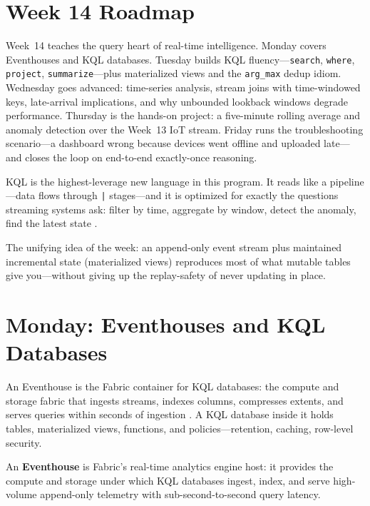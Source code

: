 \section{Week 14 Roadmap}
Week~14 teaches the query heart of real-time intelligence. Monday covers Eventhouses and KQL databases. Tuesday builds KQL fluency---\texttt{search}, \texttt{where}, \texttt{project}, \texttt{summarize}---plus materialized views and the \texttt{arg\_max} dedup idiom. Wednesday goes advanced: time-series analysis, stream joins with time-windowed keys, late-arrival implications, and why unbounded lookback windows degrade performance. Thursday is the hands-on project: a five-minute rolling average and anomaly detection over the Week~13 IoT stream. Friday runs the troubleshooting scenario---a dashboard wrong because devices went offline and uploaded late---and closes the loop on end-to-end exactly-once reasoning.

KQL is the highest-leverage new language in this program. It reads like a pipeline---data flows through \texttt{|} stages---and it is optimized for exactly the questions streaming systems ask: filter by time, aggregate by window, detect the anomaly, find the latest state \cite{microsoftKQL,microsoftFabricEventhouse}.

\begin{notebox}
The unifying idea of the week: an append-only event stream plus maintained incremental state (materialized views) reproduces most of what mutable tables give you---without giving up the replay-safety of never updating in place.
\end{notebox}

\section{Monday: Eventhouses and KQL Databases}
An Eventhouse is the Fabric container for KQL databases: the compute and storage fabric that ingests streams, indexes columns, compresses extents, and serves queries within seconds of ingestion \cite{microsoftFabricEventhouse}. A KQL database inside it holds tables, materialized views, functions, and policies---retention, caching, row-level security.

\begin{definitionbox}
An \textbf{Eventhouse} is Fabric's real-time analytics engine host: it provides the compute and storage under which KQL databases ingest, index, and serve high-volume append-only telemetry with sub-second-to-second query latency.
\end{definitionbox}

